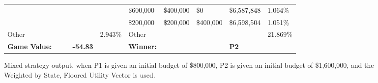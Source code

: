 \documentclass[11pt]{article}
\begin{document}
\begin{figure}
\begin{tabular}{ |p{1.0cm}p{1.0cm}p{1.0cm}p{2.0cm}|p{1.0cm}||p{1.0cm}p{1.0cm}p{1.0cm}p{2.0cm}|p{1.0cm}|}
&&&&                                                & \$600,000& \$400,000 & \$0 & \$6,587,848  & 1.064\% \\
&&&&                                                & \$200,000& \$200,000& \$400,000 & \$6,598,504  & 1.051\% \\
\hline
Other &&&& 2.943\% & Other &&&& 21.869\% \\
\hline
\small \textbf{Game Value:} &&& \small \textbf{-54.83} && \small \textbf{Winner:} &&& \small \textbf{P2}&\\
\hline
\end{tabular}
\caption{Mixed strategy output, when P1 is given an initial budget of \$800,000, P2 is given an initial budget of \$1,600,000, and the Weighted by State, Floored Utility Vector is used.}
\label{8v16table.2}
\end{figure}
\end{document}
